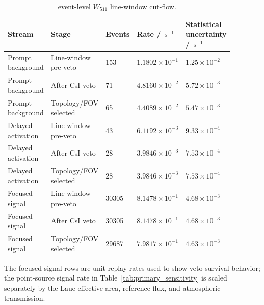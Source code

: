 \documentclass[11pt]{article}
\newcommand{\cps}{\ensuremath{\,\mathrm{s^{-1}}}}
\newcommand{\wii}{W_{511}}
\newcommand{\added}[1]{{\color{red}#1}}
\begin{document}
\begin{table}[t]
\centering
\caption{\added{event-level $\wii$ line-window cut-flow.}}
\label{tab:phase2_cutflow}
\footnotesize
{
\setlength{\tabcolsep}{3pt}
\begin{tabular}{p{0.20\linewidth}p{0.24\linewidth}p{0.08\linewidth}p{0.16\linewidth}p{0.20\linewidth}}
\toprule
Stream & Stage & Events & Rate / $\cps$ & Statistical uncertainty / $\cps$ \\
\midrule
Prompt background & Line-window pre-veto & 153 & $1.1802\times10^{-1}$ & $1.25\times10^{-2}$ \\
Prompt background & After CsI veto & 71 & $4.8160\times10^{-2}$ & $5.72\times10^{-3}$ \\
Prompt background & Topology/FOV selected & 65 & $4.4089\times10^{-2}$ & $5.47\times10^{-3}$ \\
Delayed activation & Line-window pre-veto & 43 & $6.1192\times10^{-3}$ & $9.33\times10^{-4}$ \\
Delayed activation & After CsI veto & 28 & $3.9846\times10^{-3}$ & $7.53\times10^{-4}$ \\
Delayed activation & Topology/FOV selected & 28 & $3.9846\times10^{-3}$ & $7.53\times10^{-4}$ \\
Focused signal & Line-window pre-veto & 30305 & $8.1478\times10^{-1}$ & $4.68\times10^{-3}$ \\
Focused signal & After CsI veto & 30305 & $8.1478\times10^{-1}$ & $4.68\times10^{-3}$ \\
Focused signal & Topology/FOV selected & 29687 & $7.9817\times10^{-1}$ & $4.63\times10^{-3}$ \\
\bottomrule
\end{tabular}
\par}
\vspace{0.5ex}
\begin{minipage}{0.94\linewidth}
\footnotesize
The focused-signal rows are unit-replay rates used to show veto survival
behavior; the point-source signal rate in Table~\ref{tab:primary_sensitivity}
is scaled separately by the Laue effective area, reference flux, and atmospheric
transmission.
\end{minipage}
\end{table}
\end{document}
